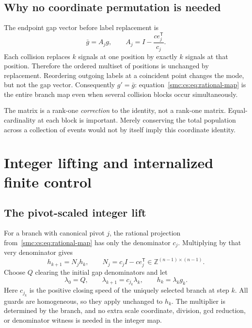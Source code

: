\documentclass[11pt,letterpaper]{article}
\numberwithin{equation}{section}
\theoremstyle{definition}
\theoremstyle{remark}
\newcommand{\Z}{\mathbb Z}
\begin{document}
\subsection{Why no coordinate permutation is needed}
The endpoint gap vector before label replacement is
\begin{equation}\label{smc:cs:eq:rational-map}
 \bar g=A_jg,\qquad
 A_j=I-\frac{c e_j^{\mathsf T}}{c_j}.
\end{equation}
Each collision replaces $k$ signals at one position by exactly $k$ signals at that position. Therefore the ordered multiset of positions is unchanged by replacement. Reordering outgoing labels at a coincident point changes the mode, but not the gap vector. Consequently $g'=\bar g$: equation~\eqref{smc:cs:eq:rational-map} is the entire branch map even when several collision blocks occur simultaneously.

The matrix is a rank-one \emph{correction} to the identity, not a rank-one matrix. Equal-cardinality at each block is important. Merely conserving the total population across a collection of events would not by itself imply this coordinate identity.

\section{Integer lifting and internalized finite control}\label{smc:cs:sec:integer}
\subsection{The pivot-scaled integer lift}
For a branch with canonical pivot $j$, the rational projection from~\eqref{smc:cs:eq:rational-map} has only the denominator $c_j$. Multiplying by that very denominator gives
\begin{equation}\label{smc:cs:eq:integer-map}
 h_{k+1}=N_jh_k,\qquad
 N_j=c_jI-c e_j^{\mathsf T}\in\Z^{(n-1)\times(n-1)}.
\end{equation}
Choose $Q$ clearing the initial gap denominators and let
\begin{equation}\label{smc:cs:eq:lift}
 \lambda_0=Q,\qquad \lambda_{k+1}=c_{j_k}\lambda_k,
 \qquad h_k=\lambda_k g_k.
\end{equation}
Here $c_{j_k}$ is the positive closing speed of the uniquely selected branch at step $k$. All guards are homogeneous, so they apply unchanged to $h_k$. The multiplier is determined by the branch, and no extra scale coordinate, division, gcd reduction, or denominator witness is needed in the integer map.
\end{document}
